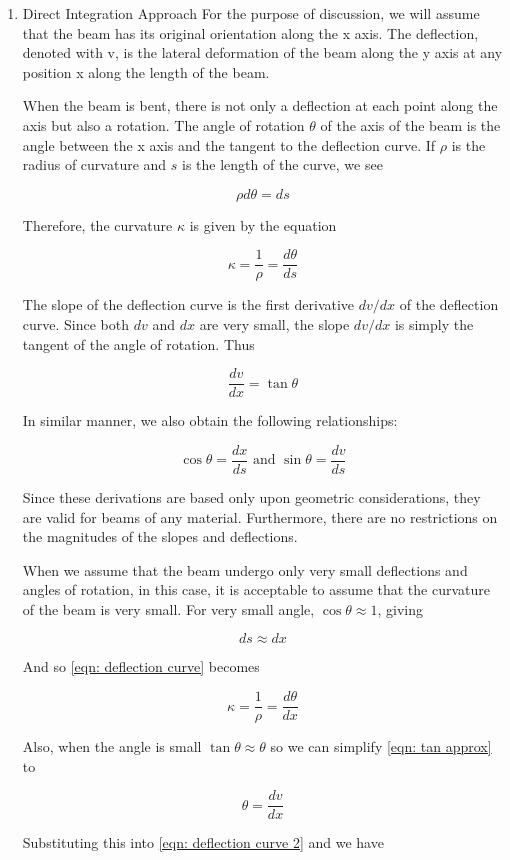 \documentclass[a4paper,openany,nobib]{tufte-book}
\begin{document}
\begin{enumerate}
\item Direct Integration Approach
\label{direct-integration-approach}
For the purpose of discussion, we will assume that the beam has its
original orientation along the x axis. The deflection, denoted with v,
is the lateral deformation of the beam along the y axis at any position
x along the length of the beam.

When the beam is bent, there is not only a deflection at each point
along the axis but also a rotation. The angle of rotation \(\theta\) of
the axis of the beam is the angle between the x axis and the tangent to
the deflection curve. If \(\rho\) is the radius of curvature and \(s\) is
the length of the curve, we see


$$\rho d\theta  = ds$$

Therefore, the curvature \(\kappa\) is given by the equation

$$ \kappa  = \frac{1}{\rho } = \frac{d\theta }{ds}$$

The slope of the deflection curve is the first derivative \(dv/dx\) of the
deflection curve. Since both \(dv\) and \(dx\) are very small, the slope
\(dv/dx\) is simply the tangent of the angle of rotation. Thus

$$ \frac{dv}{dx} = \tan \theta$$

In similar manner, we also obtain the following relationships:

$$\cos \theta  = \frac{dx}{ds} \text{ and } \sin \theta  = \frac{dv}{ds}$$

Since these derivations are based only upon geometric considerations,
they are valid for beams of any material. Furthermore, there are no
restrictions on the magnitudes of the slopes and deflections.

When we assume that the beam undergo only very small deflections and
angles of rotation, in this case, it is acceptable to assume that the
curvature of the beam is very small. For very small angle,
\(\cos\theta \approx 1\), giving

$$ds \approx dx$$

And so \ref{eqn: deflection curve} becomes

$$ \kappa  = \frac{1}{\rho } = \frac{d\theta }{dx}$$

Also, when the angle is small \(\tan\theta \approx \theta\) so we can
simplify \ref{eqn: tan approx} to

$$\theta  = \frac{dv}{dx}$$

Substituting this into \ref{eqn: deflection curve 2} and we have


\end{enumerate}
\end{document}

